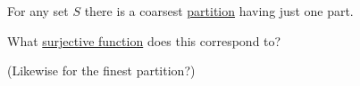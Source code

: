 
For any set $S$ there is a coarsest \href{doc/1 math/Seven Sketches in Compositionality/1 Chapter 1: Generative Effects/2 What is order/Partition}{partition} having just one part.

What \href{doc/1 math/Seven Sketches in Compositionality/1 Chapter 1: Generative Effects/2 What is order/Function}{surjective function} does this correspond to?

(Likewise for the finest partition?)